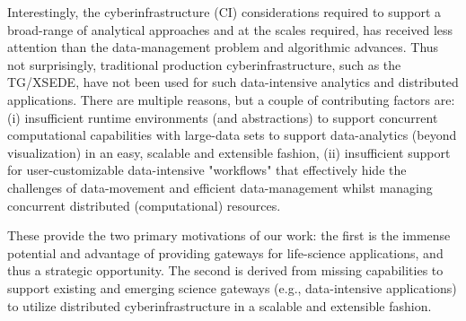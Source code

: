 \documentclass[]{svjour3}
\begin{document}
 

Interestingly, the cyberinfrastructure (CI) considerations required to
support a broad-range of analytical approaches and at the scales
required, has received less attention than the data-management problem
and algorithmic advances. Thus not surprisingly, traditional
production cyberinfrastructure, such as the TG/XSEDE, have not been used for
such data-intensive analytics and distributed applications. There are
multiple reasons, but a couple of contributing factors are: (i)
insufficient runtime environments (and abstractions) to support
concurrent computational capabilities with large-data sets to support
data-analytics (beyond visualization) in an easy, scalable and
extensible fashion, (ii) insufficient support for user-customizable
data-intensive "workflows" that effectively hide the challenges of
data-movement and efficient data-management whilst managing concurrent
distributed (computational) resources.

These provide the two primary motivations of our work: the first is
the immense potential and advantage of providing gateways for
life-science applications, and thus a strategic opportunity. The
second is derived from missing capabilities to support existing and
emerging science gateways (e.g., data-intensive applications) to
utilize distributed cyberinfrastructure in a scalable and extensible
fashion.


\end{document}
